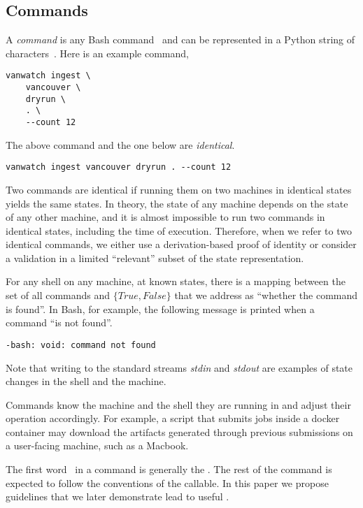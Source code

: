 \subsection{Commands}\label{command}\label{commands}

A \emph{command} is any Bash command~\cite{shell_syntax} and can be represented in a Python string of characters~\cite{python_string}. Here is an example command,
%
\begin{verbatim}
vanwatch ingest \
    vancouver \
    dryrun \
    . \
    --count 12
\end{verbatim}
%
The above command and the one below are \emph{identical}.
%
\begin{verbatim}
vanwatch ingest vancouver dryrun . --count 12
\end{verbatim}
%
Two commands are identical if running them on two machines in identical states yields the same states. In theory, the state of any machine depends on the state of any other machine, and it is almost impossible to run two commands in identical states, including the time of execution. Therefore, when we refer to two identical commands, we either use a derivation-based proof of identity or consider a validation in a limited ``relevant'' subset of the state representation.

For any shell on any machine, at known states, there is a mapping between the set of all commands and $\{True,False\}$ that we address as ``whether the command is found''. In Bash, for example, the following message is printed when a command ``is not found''.
%
\begin{verbatim}
-bash: void: command not found
\end{verbatim}
%
Note that writing to the standard streams \emph{stdin} and \emph{stdout} are examples of state changes in the shell and the machine. 

Commands know the machine and the shell they are running in and adjust their operation accordingly. For example, a script that submits jobs inside a docker container may download the artifacts generated through previous submissions on a user-facing machine, such as a Macbook. 

The first word~\cite{shell_syntax} in a command is generally the \keyword{callables}. The rest of the command is expected to follow the conventions of the callable. In this paper we propose guidelines that we later demonstrate lead to useful .




